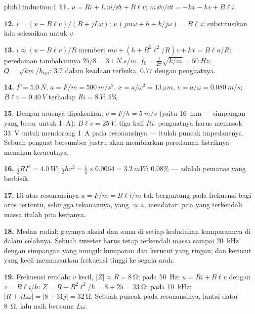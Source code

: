 \begin{solution}{pb:b1:induction:1}
\textbf{11.} $u = Ri + L\,\dd i/\dd t + B\ell v$; $m\,\dd v/\dd t = -kx - hv + B\ell i$.

\textbf{12.} $\underline i = (\underline u - B\ell\underline v)/(R + jL\omega)$; $\underline v\,(jm\omega + h +
k/j\omega) = B\ell\,\underline i$; substitusikan lalu selesaikan untuk $\underline v$.

\textbf{13.} $i \approx (u - B\ell v)/R$ memberi $m\dot v + (h + B^2\ell^2/R)v + kx =
B\ell u/R$: peredaman tambahannya $25/8 = \qty{3.1}{N.s/m}$. $f_0 = \tfrac1{2\pi}\sqrt{k/m} =
\qty{50}{Hz}$; $Q = \sqrt{km}/h_{\text{tot}}$: $3.2$ dalam keadaan terbuka, $0.77$ dengan
penguatnya.

\textbf{14.} $F = \qty{5.0}{N}$, $a = F/m = \qty{500}{m/s^2}$, $x = a/\omega^2 =
\qty{13}{\micro m}$, $v = a/\omega = \qty{0.080}{m/s}$; $B\ell v = \qty{0.40}{V}$ terhadap
$Ri = \qty{8}{V}$: $5\%$.

\textbf{15.} Dengan arusnya dipaksakan, $v = F/h = \qty{5}{m/s}$ (yaitu
 \qty{16}{mm} --- simpangan yang besar untuk \qty{1}{A}); $B\ell v =
\qty{25}{V}$, tiga kali $Ri$: penguatnya harus memasok \qty{33}{V} untuk mendorong
\qty{1}{A} pada resonansinya --- itulah puncak impedansnya. Sebuah penguat bersumber 
justru akan membiarkan peredaman listriknya menahan kerucutnya.

\textbf{16.} $\tfrac12RI^2 = \qty{4.0}{W}$; $\tfrac12hv^2 = \tfrac12 \times 0.0064 =
\qty{3.2}{mW}$:  $0.08\%$ ---  adalah pemanas yang
berbisik.

\textbf{17.} Di atas resonansinya $a = F/m = B\ell i/m$ tak bergantung pada
frekuensi bagi arus tertentu, sehingga tekanannya, yang $\propto a$, mendatar:
pita yang terkendali massa itulah pita kerjanya.

\textbf{18.} Medan radial: gayanya aksial dan sama di setiap
kedudukan kumparannya di dalam celahnya. Sebuah tweeter harus tetap terkendali massa
sampai \qty{20}{kHz} dengan simpangan yang mungil: kumparan dan kerucut yang ringan; dan
kerucut yang kecil memancarkan frekuensi tinggi ke segala arah.

\textbf{19.} Frekuensi rendah: $v$ kecil, $|Z| \approx R = \qty{8}{\ohm}$; pada
\qty{50}{Hz}: $u = Ri + B\ell v$ dengan $v = B\ell i/h$: $Z = R + B^2\ell^2/h = 8 + 25 =
\qty{33}{\ohm}$; pada \qty{10}{kHz}: $|R + jL\omega| = |8 + 31j| = \qty{32}{\ohm}$. Sebuah
puncak pada resonansinya, lantai datar \qty{8}{\ohm}, lalu naik bersama $L\omega$.


\end{solution}
